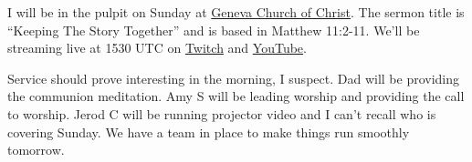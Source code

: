 I will be in the pulpit on Sunday at
\href{https://www.genevachurchofchrist.org/}{Geneva Church of Christ}.
The sermon title is ``Keeping The Story Together'' and is based in
Matthew 11:2-11. We'll be streaming live at 1530 UTC on
\href{https://www.twitch.tv/GenevaChurchOfChrist}{Twitch} and
\href{https://www.youtube.com/channel/UCs1dDMVsjKcgeOynUXZkZww}{YouTube}.

Service should prove interesting in the morning, I suspect. Dad will be
providing the communion meditation. Amy S will be leading worship and
providing the call to worship. Jerod C will be running projector video
and I can't recall who is covering Sunday. We have a team in place to
make things run smoothly tomorrow.
